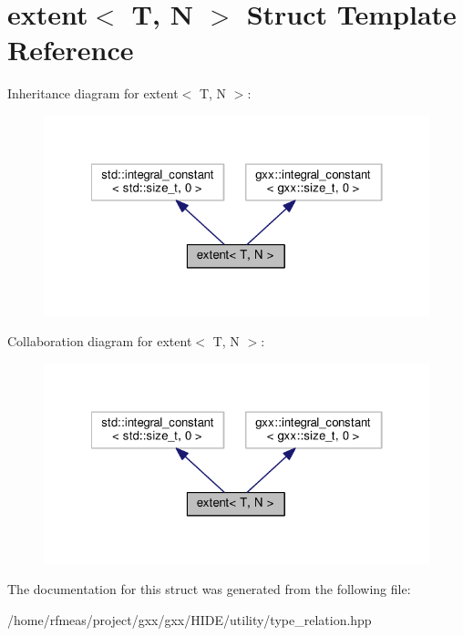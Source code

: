 \hypertarget{structextent}{}\section{extent$<$ T, N $>$ Struct Template Reference}
\label{structextent}


Inheritance diagram for extent$<$ T, N $>$\+:
\nopagebreak
\begin{figure}[H]
\begin{center}
\leavevmode
\includegraphics[width=322pt]{structextent__inherit__graph}
\end{center}
\end{figure}


Collaboration diagram for extent$<$ T, N $>$\+:
\nopagebreak
\begin{figure}[H]
\begin{center}
\leavevmode
\includegraphics[width=322pt]{structextent__coll__graph}
\end{center}
\end{figure}


The documentation for this struct was generated from the following file\+:\begin{DoxyCompactItemize}
\item 
/home/rfmeas/project/gxx/gxx/\+H\+I\+D\+E/utility/type\+\_\+relation.\+hpp\end{DoxyCompactItemize}
